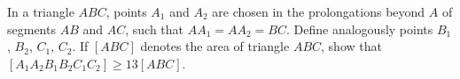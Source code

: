 In a triangle $ABC$,  points $A_{1}$ and $A_{2}$ are chosen in the prolongations beyond $A$ of segments $AB$ and $AC$,  such that $AA_{1}=AA_{2}=BC$. Define analogously points $B_{1}$,  $B_{2}$,  $C_{1}$,  $C_{2}$. If $[ABC]$ denotes the area of triangle $ABC$,  show that $[A_{1}A_{2}B_{1}B_{2}C_{1}C_{2}] \geq 13 [ABC]$.